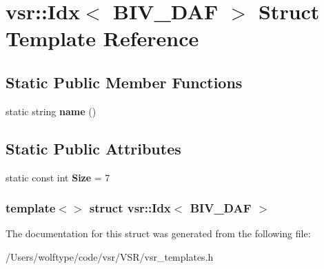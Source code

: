 \hypertarget{structvsr_1_1_idx_3_01_b_i_v___d_a_f_01_4}{\section{vsr\-:\-:Idx$<$ B\-I\-V\-\_\-\-D\-A\-F $>$ Struct Template Reference}
\label{structvsr_1_1_idx_3_01_b_i_v___d_a_f_01_4}
}
\subsection*{Static Public Member Functions}
\begin{DoxyCompactItemize}
\item 
\hypertarget{structvsr_1_1_idx_3_01_b_i_v___d_a_f_01_4_a51b1c43d25a4ced1d2d84c5b604d70b6}{static string {\bfseries name} ()}\label{structvsr_1_1_idx_3_01_b_i_v___d_a_f_01_4_a51b1c43d25a4ced1d2d84c5b604d70b6}

\end{DoxyCompactItemize}
\subsection*{Static Public Attributes}
\begin{DoxyCompactItemize}
\item 
\hypertarget{structvsr_1_1_idx_3_01_b_i_v___d_a_f_01_4_aa634ce038169ce415354179805c1e371}{static const int {\bfseries Size} = 7}\label{structvsr_1_1_idx_3_01_b_i_v___d_a_f_01_4_aa634ce038169ce415354179805c1e371}

\end{DoxyCompactItemize}
\subsubsection*{template$<$$>$ struct vsr\-::\-Idx$<$ B\-I\-V\-\_\-\-D\-A\-F $>$}



The documentation for this struct was generated from the following file\-:\begin{DoxyCompactItemize}
\item 
/\-Users/wolftype/code/vsr/\-V\-S\-R/vsr\-\_\-templates.\-h\end{DoxyCompactItemize}
